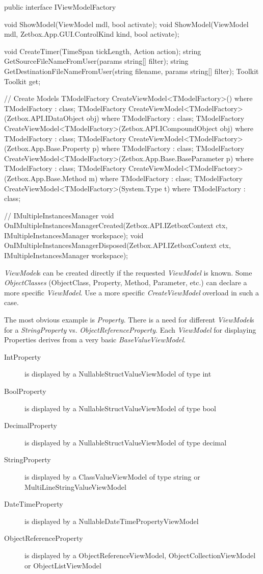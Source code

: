\begin{CS}
public interface IViewModelFactory
{
    void ShowModel(ViewModel mdl, bool activate);
    void ShowModel(ViewModel mdl, Zetbox.App.GUI.ControlKind kind, bool activate);

    void CreateTimer(TimeSpan tickLength, Action action);
    string GetSourceFileNameFromUser(params string[] filter);
    string GetDestinationFileNameFromUser(string filename, params string[] filter);
    Toolkit Toolkit { get; }

    // Create Models
    TModelFactory CreateViewModel<TModelFactory>() where TModelFactory : class;
    TModelFactory CreateViewModel<TModelFactory>(Zetbox.API.IDataObject obj) where TModelFactory : class;
    TModelFactory CreateViewModel<TModelFactory>(Zetbox.API.ICompoundObject obj) where TModelFactory : class;
    TModelFactory CreateViewModel<TModelFactory>(Zetbox.App.Base.Property p) where TModelFactory : class;
    TModelFactory CreateViewModel<TModelFactory>(Zetbox.App.Base.BaseParameter p) where TModelFactory : class;
    TModelFactory CreateViewModel<TModelFactory>(Zetbox.App.Base.Method m) where TModelFactory : class;
    TModelFactory CreateViewModel<TModelFactory>(System.Type t) where TModelFactory : class;

    // IMultipleInstancesManager
    void OnIMultipleInstancesManagerCreated(Zetbox.API.IZetboxContext ctx, IMultipleInstancesManager workspace);
    void OnIMultipleInstancesManagerDisposed(Zetbox.API.IZetboxContext ctx, IMultipleInstancesManager workspace);
}
\end{CS}

\emph{ViewModel}s can be created directly if the requested \emph{ViewModel} is
known. Some \emph{ObjectClasses} (ObjectClass, Property, Method, Parameter,
etc.) can declare a more specific \emph{ViewModel}. Use a more specific
\emph{CreateViewModel} overload in such a case.

The most obvious example is \emph{Property}. There is a need for different
\emph{ViewModel}s for a \emph{StringProperty} vs.
\emph{ObjectReferenceProperty}. Each \emph{ViewModel} for displaying Properties
derives from a very basic \emph{BaseValueViewModel}.

\begin{description}
\item[IntProperty] { is displayed by a NullableStructValueViewModel of type int
}
\item[BoolProperty] { is displayed by a NullableStructValueViewModel of type
bool}
\item[DecimalProperty] { is displayed by a NullableStructValueViewModel of type
decimal }
\item[String\-Property] { is displayed by a ClassValue\-ViewModel of type string
or MultiLine\-StringValue\-View\-Model }
\item[DateTimeProperty] { is displayed by a NullableDateTimePropertyViewModel }
\item[ObjectReference\-Property] { is displayed by a
Object\-Reference\-ViewModel, Object\-Collection\-ViewModel or Object\-List\-ViewModel }
\end{description}

